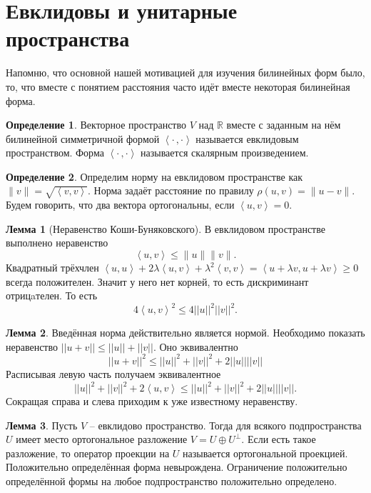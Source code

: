 \documentclass[10pt,a4paper,oneside]{book}
\theoremstyle{definition}
\newtheorem*{rem}{Замечание}
\newtheorem*{defn}{Определение}
\newtheorem{lem}{Лемма}
\newcommand{\mb}[1]{\mathbb{#1}}
\newcommand{\ovl}{\overline}
\def\lan{\left\langle }
\def\ran{\right\rangle}
\def\dfn{\begin{defn}}
\def\edfn{\end{defn}}
\def\lm{\begin{lem}}
\def\elm{\end{lem}}
\def\rm{\begin{rem}}
\def\erm{\end{rem}}
\begin{document}
\begin{comment}
\lm Если форма $h$ невырождена, то размерность $\dim U^{\bot}= n - \dim U
$
\elm

\dfn Полуторалинейная форма $h$ называется эрмитовой, если $h(u,v)=\ovl{h(v,u)}$ и косоэрмитовой, если $h(u,v)=-\ovl{h(v,u)}$.
\edfn

\rm Полуторалинейная форма над $\mb C$ эрмитова тогда и только тогда, когда её матрица $A$ в некотором базисе удовлетворяет соотношению $\ovl{A^{\top}}=A$. В случае тождественного автоморфизма эрмитовость эквивалентна симметричности.
\erm
\end{comment}




\section{Евклидовы и унитарные пространства}

Напомню, что основной нашей мотивацией для изучения билинейных форм было, то, что вместе с понятием расстояния часто идёт вместе некоторая билинейная форма.





\dfn Векторное пространство $V$ над $\mb R$ вместе с заданным на нём билинейной симметричной формой $\lan\cdot \, , \cdot \ran$ называется евклидовым пространством. Форма $\lan\cdot \, , \cdot \ran$ называется скалярным произведением. 
\edfn

\dfn Определим  норму на евклидовом пространстве как $\|v\|=\sqrt{\lan v , v\ran }$. Норма задаёт расстояние по правилу $\rho(u,v)=\|u-v\|$. Будем говорить, что два вектора ортогональны, если $\lan u,v \ran =0$.
\edfn

\lm[Неравенство Коши-Буняковского] В евклидовом пространстве выполнено неравенство
$$ \lan u,v\ran \leq \|u\|\|v\|.$$
\proof  Квадратный трёхчлен $\lan u,u\ran +2\lambda\lan u,v\ran +\lambda^2\lan v,v\ran=\lan u+\lambda v, u+\lambda v\ran \geq 0$ всегда положителен. Значит у него нет корней, то есть дискриминант отрицaтелен. То есть $$4\lan u,v\ran^2 \leq 4 ||u||^2||v||^2.$$
\endproof
\elm

\lm Введённая норма действительно является нормой.
\proof Необходимо показать неравенство $||u+v||\leq ||u||+||v||$. Оно эквивалентно $$||u+v||^2 \leq ||u||^2+||v||^2+2||u||||v||$$
Расписывая левую часть получаем эквивалентное
$$ ||u||^2+||v||^2+2\lan u,v\ran \leq ||u||^2+||v||^2+2||u||||v||.$$
Сокращая справа и слева приходим к уже известному неравенству.
\endproof
\elm

 
\lm Пусть $V$ -- евклидово пространство. Тогда для всякого подпространства $U$ имеет место ортогональное разложение $V=U\oplus U^{\bot}$. Если есть такое разложение, то оператор проекции на $U$ называется ортогональной проекцией.
\proof Положительно определённая форма невырождена. Ограничение положительно определённой формы на любое подпространство положительно определено.
\endproof
\elm
\end{document}
